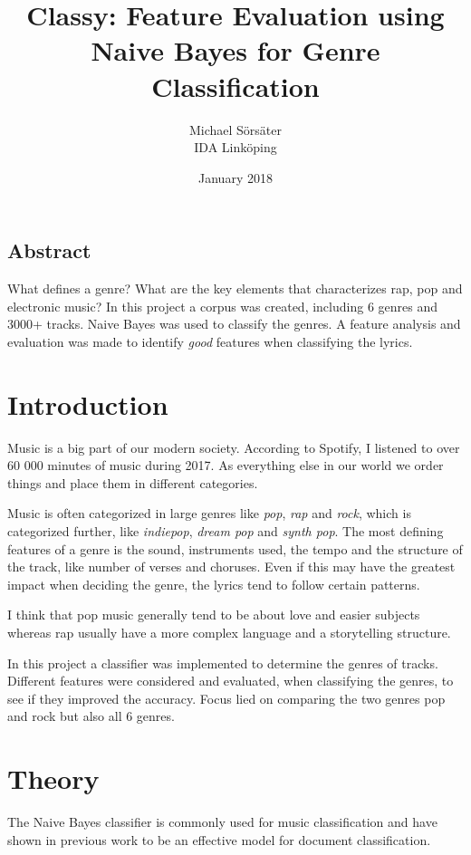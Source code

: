 \documentclass[a4paper, 12pt]{article}
\begin{document}
\date{January 2018}

\title{\Large Classy: Feature Evaluation using Naive Bayes for Genre Classification}

\author{
{Michael Sörsäter}\\
IDA Linköping
}

\maketitle

\subsection*{Abstract}

What defines a genre?
What are the key elements that characterizes rap, pop and electronic music?
In this project a corpus was created, including 6 genres and 3000+ tracks.
Naive Bayes was used to classify the genres.
A feature analysis and evaluation was made to identify \textit{good} features when classifying the lyrics.

\section{Introduction}
Music is a big part of our modern society.
According to Spotify, I listened to over 60 000 minutes of music during 2017. \cite{spotify}
As everything else in our world we order things and place them in different categories.

Music is often categorized in large genres like \textit{pop}, \textit{rap} and \textit{rock}, which is categorized further, like \textit{indiepop}, \textit{dream pop} and \textit{synth pop}.
The most defining features of a genre is the sound, instruments used, the tempo and the structure of the track, like number of verses and choruses.
Even if this may have the greatest impact when deciding the genre, the lyrics tend to follow certain patterns.

I think that pop music generally tend to be about love and easier subjects whereas rap usually have a more complex language and a storytelling structure.

In this project a classifier was implemented to determine the genres of tracks.
Different features were considered and evaluated, when classifying the genres, to see if they improved the accuracy.
Focus lied on comparing the two genres pop and rock but also all 6 genres.

\pagebreak
\section{Theory}
The Naive Bayes classifier is commonly used for music classification and have shown in previous work to be an effective model for document classification. \cite{Canicatti} \cite{optimality} \cite{bou2012classifying}
\end{document}
